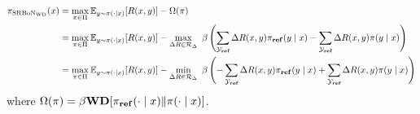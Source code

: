 \begin{equation*}
\begin{aligned}
\pi_{\mathrm{SRBoN}_\mathrm{WD}}(x) &=\max_{\pi\in \Pi}\mathbb{E}_{y \sim \pi(\cdot \mid x)}[R(x,y)] -\Omega (\pi)\\
&=\max_{\pi\in \Pi} \mathbb{E}_{y \sim \pi(\cdot \mid x)}[R(x,y)] -\max_{\Delta R \in \mathcal{R}_{\Delta}}\,\,\beta\left(\sum_\mathcal{Y_{\textbf{ref}}} \Delta R(x,y)\pi_{\textnormal{\textbf{ref}}}(y \mid x)-\sum_\mathcal{Y_{\textbf{ref}}} \Delta R(x,y)\pi(y \mid x)\right)\\
&=\max_{\pi\in \Pi}  \mathbb{E}_{y \sim \pi(\cdot \mid x)}[R(x,y)] -\min_{\Delta R \in \mathcal{R}_{\Delta}}\,\,\beta\left(-\sum_\mathcal{Y_{\textbf{ref}}} \Delta R(x,y)\pi_{\textnormal{\textbf{ref}}}(y \mid x)+\sum_\mathcal{Y_{\textbf{ref}}} \Delta R(x,y)\pi(y \mid x)\right)\\
\end{aligned}
\end{equation*}
where $\Omega (\pi) = \beta \textbf{WD}[\pi_{\textnormal{\textbf{ref}}} (\cdot \mid x) \| \pi(\cdot \mid x)]$.

